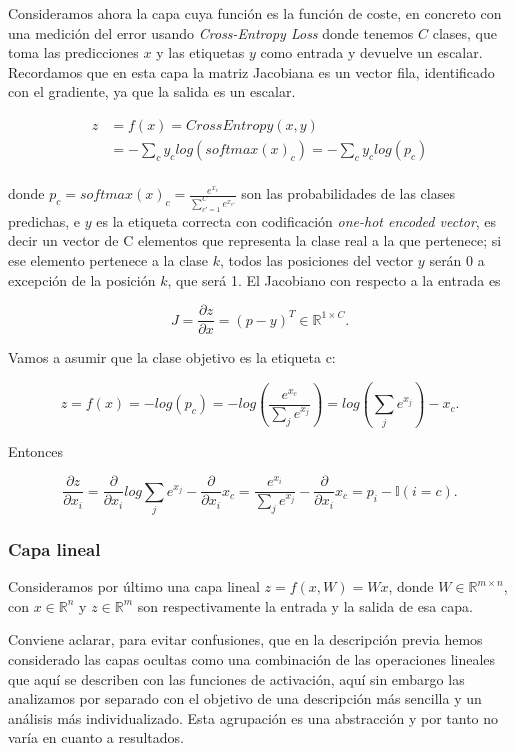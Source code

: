 Consideramos ahora la capa cuya función es la función de coste, en concreto con una medición del error usando \textit{Cross-Entropy Loss} donde tenemos $C$ clases, que toma las predicciones $x$ y las etiquetas $y$ como entrada y devuelve un escalar. Recordamos que en esta capa la matriz Jacobiana es un vector fila, identificado con el gradiente, ya que la salida es un escalar.

\begin{align*}
	z&=f(x)=CrossEntropy(x,y) \\
	&= - \sum_c y_c log(softmax(x)_c) = - \sum_c y_c log(p_c)\\
\end{align*}

donde $p_c=softmax(x)_c= \frac{e^{x_c}}{\sum_{c'=1}^C e^{x_{c'}}}$ son las probabilidades de las clases predichas, e $y$ es la etiqueta correcta con codificación \textit{one-hot encoded vector}, es decir un vector de C elementos que representa la clase real a la que pertenece; si ese elemento pertenece a la clase $k$, todos las posiciones del vector $y$ serán 0 a excepción de la posición $k$, que será 1. El Jacobiano con respecto a la entrada es

$$J= \frac{\partial z}{\partial x}= (p-y)^T \in \mathbb{R}^{1\times C}.$$

Vamos a asumir que la clase objetivo es la etiqueta c:

$$z=f(x)=-log(p_c)=-log \left (\frac{e^{x_c}}{\sum_j e^{x_j}} \right ) = log \left ( \sum_j e^{x_j} \right ) - x_c.$$

Entonces

$$\frac{\partial z}{\partial x_i} = \frac{\partial}{\partial x_i} log \sum_j e^{x_j} - \frac{\partial}{\partial x_i}x_c = \frac{e^{x_i}}{\sum_j e^{x_j}} - \frac{\partial}{\partial x_i}x_c = p_i - \mathbb{I}(i=c).$$

\subsubsection{Capa lineal}

Consideramos por último una capa lineal $z=f(x,W)=Wx$, donde $W \in \mathbb{R}^{m \times n}$, con $x \in \mathbb{R}^n$ y $z \in \mathbb{R}^m$ son respectivamente la entrada y la salida de esa capa.

Conviene aclarar, para evitar confusiones, que en la descripción previa hemos considerado las capas ocultas como una combinación de las operaciones lineales que aquí se describen con las funciones de activación, aquí sin embargo las analizamos por separado con el objetivo de una descripción más sencilla y un análisis más individualizado. Esta agrupación es una abstracción y por tanto no varía en cuanto a resultados.


